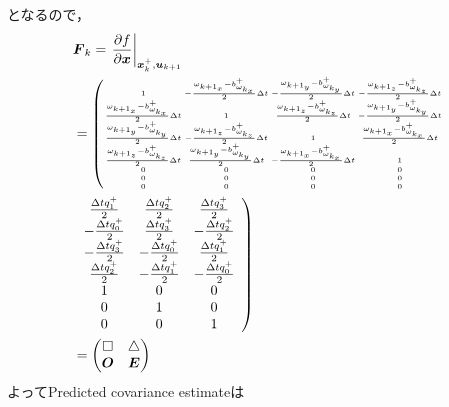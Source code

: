 となるので，
\begin{align}
  &\boldsymbol{F}_{k} = \left. \frac{\partial f}{\partial \boldsymbol{x}}\right|_{\boldsymbol{x}_{k}^{+}, \boldsymbol{u}_{k+1}}\\
  &=
  {\tiny
    \setlength\arraycolsep{1pt}
    \left(
    \begin{array}{cccc}
      1 & -\omegawithbias{x} & -\omegawithbias{y} & -\omegawithbias{z}\\
      \omegawithbias{x} & 1 & \omegawithbias{z} & -\omegawithbias{y}\\
      \omegawithbias{y} & -\omegawithbias{z} & 1 &\omegawithbias{x}\\
      \omegawithbias{z} & \omegawithbias{y} & -\omegawithbias{x} & 1\\
      0 & 0 & 0 & 0\\
      0 & 0 & 0 & 0\\
      0 & 0 & 0 & 0
    \end{array}\nonumber
    \right.
  }\\
  & \left.
  \begin{array}{ccc}
     \tmpbibun{1} &  \tmpbibun{2} &  \tmpbibun{3}\\
    -\tmpbibun{0} &  \tmpbibun{3} & -\tmpbibun{2}\\
    -\tmpbibun{3} & -\tmpbibun{0} &  \tmpbibun{1}\\
     \tmpbibun{2} & -\tmpbibun{1} & -\tmpbibun{0}\\
     1 & 0 & 0\\
     0 & 1 & 0\\
     0 & 0 & 1
  \end{array}
  \right)\\
  &=
  \begin{pmatrix}
    \Box & \triangle\\
    \boldsymbol{O} & \boldsymbol{E}
  \end{pmatrix}
\end{align}
よってPredicted covariance estimateは
